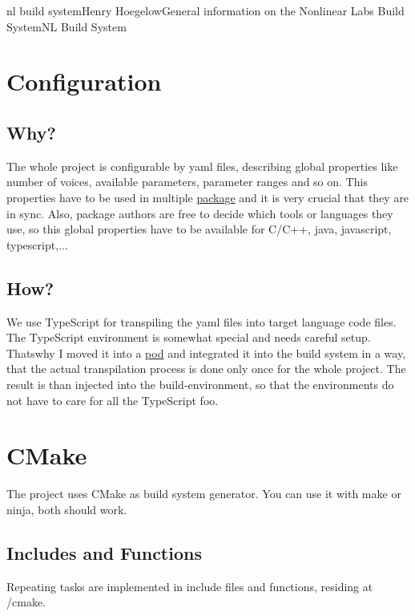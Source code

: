 \documentclass[11pt]{article}
\begin{document}
\begin{Name}{1}{nl build system}{Henry Hoegelow}{General information on the Nonlinear Labs Build System}{NL Build System}
\section{Configuration}

\subsection{Why?} \label{whygenerated}
The whole project is configurable by yaml files, describing global properties like number of voices, available parameters, parameter ranges and so on. This properties have to be used in multiple \hyperref[package]{package} and it is very crucial that they are in sync. Also, package authors are free to decide which tools or languages they use, so this global properties have to be available for C/C++, java, javascript, typescript,...

\subsection{How?}
We use TypeScript for transpiling the yaml files into target language code files. The TypeScript environment is somewhat special and needs careful setup. Thatswhy I moved it into a \hyperref[pod]{pod} and integrated it into the build system in a way, that the actual transpilation process is done only once for the whole project. The result is than injected into the build-environment, so that the environments do not have to care for all the TypeScript foo.

\section{CMake}
The project uses CMake as build system generator. You can use it with make or ninja, both should work.

\subsection{Includes and Functions}
Repeating tasks are implemented in include files and functions, residing at /cmake.


\end{Name}
\end{document}
